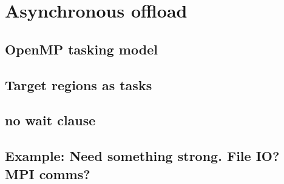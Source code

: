 

\chapter{Asynchronous offload}
\section{OpenMP tasking model}
\section{Target regions as tasks}
\section{no wait clause}
\section{Example: Need something strong. File IO? MPI comms?}
